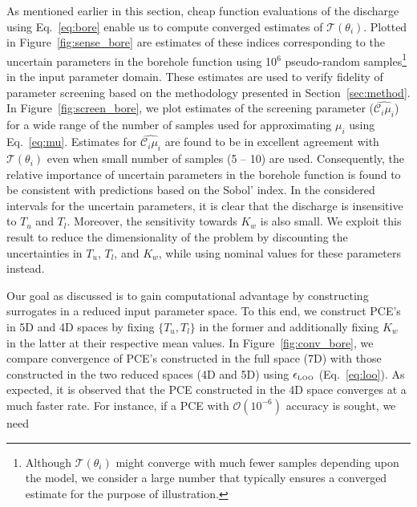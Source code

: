 As mentioned earlier in this section, cheap function evaluations of the discharge using 
Eq.~\ref{eq:bore} enable us to compute converged estimates of $\mathcal{T}(\theta_i)$. Plotted in
Figure~\ref{fig:sense_bore} are estimates of these indices corresponding to the uncertain
parameters in the borehole function using 10$^6$ pseudo-random
samples\footnote{Although $\mathcal{T}(\theta_i)$ 
might converge with much fewer samples depending upon the model, we consider a large number that
typically ensures a converged estimate for the purpose of illustration.} in the input parameter domain. 
These estimates are used to verify fidelity of
parameter screening based on the methodology presented in Section~\ref{sec:method}. 
In Figure~\ref{fig:screen_bore}, we plot estimates of the screening parameter ($\hat{\mathcal{C}_i\mu_i}$)
for a wide range of the number of samples used for approximating $\mu_i$ using Eq.~\ref{eq:mu}.
Estimates for $\hat{\mathcal{C}_i\mu_i}$ are found to be in excellent agreement with $\mathcal{T}(\theta_i)$
even when small number of samples (5 -- 10) are used. 
Consequently, the relative importance of uncertain 
parameters in the borehole function is found to be consistent with predictions based on the Sobol' index. 
In the considered intervals for the uncertain parameters, it is clear that the discharge is insensitive to
$T_u$ and $T_l$. Moreover, the sensitivity towards $K_w$ is also small. We exploit this result to reduce
the dimensionality of the problem by 
discounting the uncertainties in $T_u$, $T_l$, and $K_w$, while using nominal values for these
parameters instead.  

Our goal as discussed is to gain computational advantage by constructing surrogates in a 
reduced input parameter space. To this end, we construct PCE's in 5D and 4D spaces by
fixing $\{T_u,T_l\}$ in the former and additionally fixing $K_w$ in the latter at their respective
mean values. In Figure~\ref{fig:conv_bore}, we compare convergence of PCE's constructed
in the full space (7D) with those constructed in the two reduced spaces (4D and 5D) using
$\epsilon_{\mbox{\tiny{LOO}}}$ (Eq.~\ref{eq:loo}). As expected, it is observed that the PCE
constructed in the 4D space converges at a much faster rate. For instance, if a PCE with
$\mathcal{O}(10^{-6})$ accuracy is sought, we need 





































